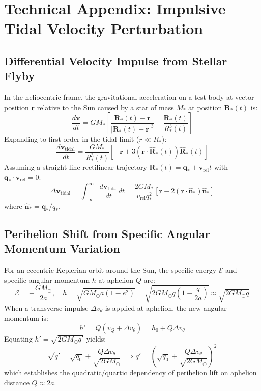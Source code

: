 \documentclass[11pt,a4paper]{article}
\begin{document}
\appendix
\section{Technical Appendix: Impulsive Tidal Velocity Perturbation}
\subsection{Differential Velocity Impulse from Stellar Flyby}
In the heliocentric frame, the gravitational acceleration on a test body at vector position $\mathbf{r}$ relative to the Sun caused by a star of mass $M_*$ at position $\mathbf{R}_*(t)$ is:
\begin{equation}
\frac{d\mathbf{v}}{dt} = G M_* \left[ \frac{\mathbf{R}_*(t) - \mathbf{r}}{|\mathbf{R}_*(t) - \mathbf{r}|^3} - \frac{\mathbf{R}_*(t)}{R_*^3(t)} \right]
\end{equation}
Expanding to first order in the tidal limit ($r \ll R_*$):
\begin{equation}
\frac{d\mathbf{v}_{\text{tidal}}}{dt} = \frac{G M_*}{R_*^3(t)} \left[ -\mathbf{r} + 3 (\mathbf{r}\cdot \hat{\mathbf{R}}_*(t)) \hat{\mathbf{R}}_*(t) \right]
\end{equation}
Assuming a straight-line rectilinear trajectory $\mathbf{R}_*(t) = \mathbf{q}_* + \mathbf{v}_{\text{rel}} t$ with $\mathbf{q}_*\cdot \mathbf{v}_{\text{rel}} = 0$:
\begin{equation}
\Delta \mathbf{v}_{\text{tidal}} = \int_{-\infty}^{\infty} \frac{d\mathbf{v}_{\text{tidal}}}{dt} dt = \frac{2 G M_*}{v_{\text{rel}} q_*^2} \left[ \mathbf{r} - 2(\mathbf{r}\cdot \hat{\mathbf{n}}_*) \hat{\mathbf{n}}_* \right]
\end{equation}
where $\hat{\mathbf{n}}_* = \mathbf{q}_*/q_*$.

\subsection{Perihelion Shift from Specific Angular Momentum Variation}
For an eccentric Keplerian orbit around the Sun, the specific energy $\mathcal{E}$ and specific angular momentum $h$ at aphelion $Q$ are:
\begin{equation}
\mathcal{E} = -\frac{G M_\odot}{2a}, \quad h = \sqrt{G M_\odot a(1 - e^2)} = \sqrt{2 G M_\odot q \left(1 - \frac{q}{2a}\right)} \approx \sqrt{2 G M_\odot q}
\end{equation}
When a transverse impulse $\Delta v_\theta$ is applied at aphelion, the new angular momentum is:
\begin{equation}
h' = Q (v_Q + \Delta v_\theta) = h_0 + Q \Delta v_\theta
\end{equation}
Equating $h' = \sqrt{2 G M_\odot q'}$ yields:
\begin{equation}
\sqrt{q'} = \sqrt{q_0} + \frac{Q \Delta v_\theta}{\sqrt{2 G M_\odot}} \implies q' = \left( \sqrt{q_0} + \frac{Q \Delta v_\theta}{\sqrt{2 G M_\odot}} \right)^2
\end{equation}
which establishes the quadratic/quartic dependency of perihelion lift on aphelion distance $Q \approx 2a$.
\end{document}
